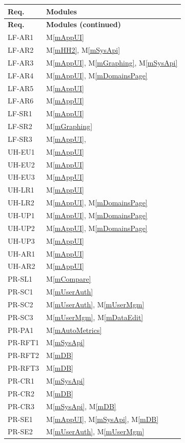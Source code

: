 \documentclass[12pt, titlepage]{article}
\newcommand{\mref}[1]{M\ref{#1}}
\begin{document}
\begin{longtable}{p{} p{}}
\toprule
\textbf{Req.} & \textbf{Modules}\\
\midrule
\endfirsthead
\toprule
\textbf{Req.} & \textbf{Modules (continued)}\\
\midrule
\endhead
\bottomrule
\endfoot
LF-AR1 & \mref{mAppUI}\\
LF-AR2 & \mref{mHH2}, \mref{mSysApi}\\
LF-AR3 & \mref{mAppUI}, \mref{mGraphing}, \mref{mSysApi}\\
LF-AR4 & \mref{mAppUI}, \mref{mDomainsPage}\\
LF-AR5 & \mref{mAppUI}\\
LF-AR6 & \mref{mAppUI}\\
LF-SR1 & \mref{mAppUI}\\
LF-SR2 & \mref{mGraphing}\\
LF-SR3 & \mref{mAppUI},\\
UH-EU1 & \mref{mAppUI}\\
UH-EU2 & \mref{mAppUI}\\
UH-EU3 & \mref{mAppUI}\\
UH-LR1 & \mref{mAppUI}\\
UH-LR2 & \mref{mAppUI}, \mref{mDomainsPage}\\
UH-UP1 & \mref{mAppUI}, \mref{mDomainsPage}\\
UH-UP2 & \mref{mAppUI}, \mref{mDomainsPage}\\
UH-UP3 & \mref{mAppUI}\\
UH-AR1 & \mref{mAppUI}\\
UH-AR2 & \mref{mAppUI}\\
PR-SL1 & \mref{mCompare}\\
PR-SC1 & \mref{mUserAuth}\\
PR-SC2 & \mref{mUserAuth}, \mref{mUserMgm}\\
PR-SC3 & \mref{mUserMgm}, \mref{mDataEdit}\\
PR-PA1 & \mref{mAutoMetrics}\\
PR-RFT1 & \mref{mSysApi}\\
PR-RFT2 & \mref{mDB}\\
PR-RFT3 & \mref{mDB}\\
PR-CR1 & \mref{mSysApi}\\
PR-CR2 & \mref{mDB}\\
PR-CR3 & \mref{mSysApi}, \mref{mDB}\\
PR-SE1 & \mref{mAppUI}, \mref{mSysApi}, \mref{mDB}\\
PR-SE2 & \mref{mUserAuth}, \mref{mUserMgm} \\

\end{longtable}
\end{document}
